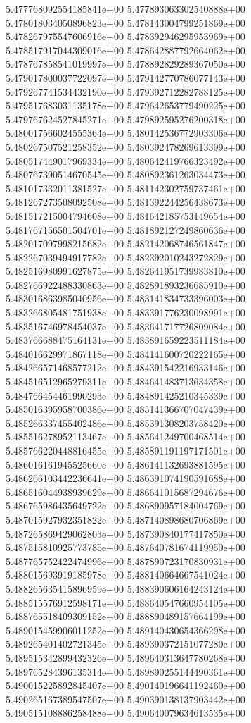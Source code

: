 5.477768092554185841e+00
5.477893063302540888e+00
5.478018034050896823e+00
5.478143004799251869e+00
5.478267975547606916e+00
5.478392946295953969e+00
5.478517917044309016e+00
5.478642887792664062e+00
5.478767858541019997e+00
5.478892829289367050e+00
5.479017800037722097e+00
5.479142770786077143e+00
5.479267741534432190e+00
5.479392712282788125e+00
5.479517683031135178e+00
5.479642653779490225e+00
5.479767624527845271e+00
5.479892595276200318e+00
5.480017566024555364e+00
5.480142536772903306e+00
5.480267507521258352e+00
5.480392478269613399e+00
5.480517449017969334e+00
5.480642419766323492e+00
5.480767390514670545e+00
5.480892361263034473e+00
5.481017332011381527e+00
5.481142302759737461e+00
5.481267273508092508e+00
5.481392244256438673e+00
5.481517215004794608e+00
5.481642185753149654e+00
5.481767156501504701e+00
5.481892127249860636e+00
5.482017097998215682e+00
5.482142068746561847e+00
5.482267039494917782e+00
5.482392010243272829e+00
5.482516980991627875e+00
5.482641951739983810e+00
5.482766922488330863e+00
5.482891893236685910e+00
5.483016863985040956e+00
5.483141834733396003e+00
5.483266805481751938e+00
5.483391776230098991e+00
5.483516746978454037e+00
5.483641717726809084e+00
5.483766688475164131e+00
5.483891659223511184e+00
5.484016629971867118e+00
5.484141600720222165e+00
5.484266571468577212e+00
5.484391542216933146e+00
5.484516512965279311e+00
5.484641483713634358e+00
5.484766454461990293e+00
5.484891425210345339e+00
5.485016395958700386e+00
5.485141366707047439e+00
5.485266337455402486e+00
5.485391308203758420e+00
5.485516278952113467e+00
5.485641249700468514e+00
5.485766220448816455e+00
5.485891191197171501e+00
5.486016161945525660e+00
5.486141132693881595e+00
5.486266103442236641e+00
5.486391074190591688e+00
5.486516044938939629e+00
5.486641015687294676e+00
5.486765986435649722e+00
5.486890957184004769e+00
5.487015927932351822e+00
5.487140898680706869e+00
5.487265869429062803e+00
5.487390840177417850e+00
5.487515810925773785e+00
5.487640781674119950e+00
5.487765752422474996e+00
5.487890723170830931e+00
5.488015693919185978e+00
5.488140664667541024e+00
5.488265635415896959e+00
5.488390606164243124e+00
5.488515576912598171e+00
5.488640547660954105e+00
5.488765518409309152e+00
5.488890489157664199e+00
5.489015459906011252e+00
5.489140430654366298e+00
5.489265401402721345e+00
5.489390372151077280e+00
5.489515342899432326e+00
5.489640313647780268e+00
5.489765284396135314e+00
5.489890255144490361e+00
5.490015225892845407e+00
5.490140196641192460e+00
5.490265167389547507e+00
5.490390138137903442e+00
5.490515108886258488e+00
5.490640079634613535e+00

